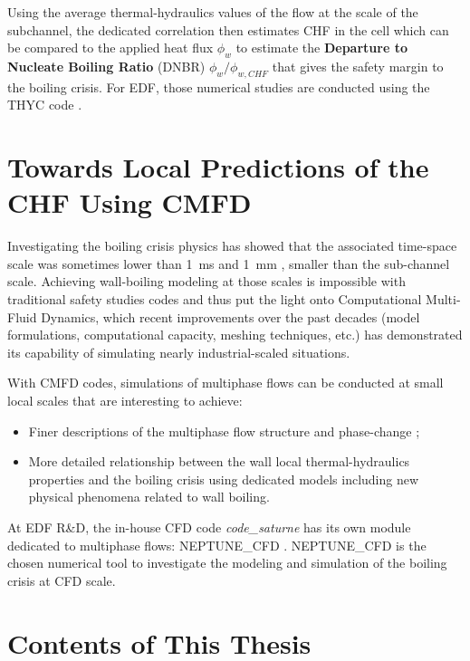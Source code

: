\npar

Using the average thermal-hydraulics values of the flow at the scale of the subchannel, the dedicated correlation then estimates CHF in the cell which can be compared to the applied heat flux $\phi_{w}$ to estimate the \textbf{Departure to Nucleate Boiling Ratio} (DNBR) $\phi_{w} / \phi_{w,CHF}$ that gives the safety margin to the boiling crisis. For EDF, those numerical studies are conducted using the THYC code \cite{aubry_thyc_1995}.

\section{Towards Local Predictions of the CHF Using CMFD}

Investigating the boiling crisis physics has showed that the associated time-space scale was sometimes lower than 1\ ms and 1\ mm \cite{bloch_study_2016}, \ie smaller than the sub-channel scale. Achieving wall-boiling modeling at those scales is impossible with traditional safety studies codes and thus put the light onto Computational Multi-Fluid Dynamics, which recent improvements over the past decades (model formulations, computational capacity, meshing techniques, etc.) has demonstrated its capability of simulating nearly industrial-scaled situations.

\npar

With CMFD codes, simulations of multiphase flows can be conducted at small local scales that are interesting to achieve:
\begin{itemize}
\item Finer descriptions of the multiphase flow structure and phase-change ;\
\item More detailed relationship between the wall local thermal-hydraulics properties and the boiling crisis using dedicated models including new physical phenomena related to wall boiling.
\end{itemize} 

At EDF R\&D, the in-house CFD code \textit{code\_saturne} has its own module dedicated to multiphase flows: NEPTUNE\_CFD \cite{guelfi_neptune_2007}. NEPTUNE\_CFD is the chosen numerical tool to investigate the modeling and simulation of the boiling crisis at CFD scale.


\section{Contents of This Thesis}

